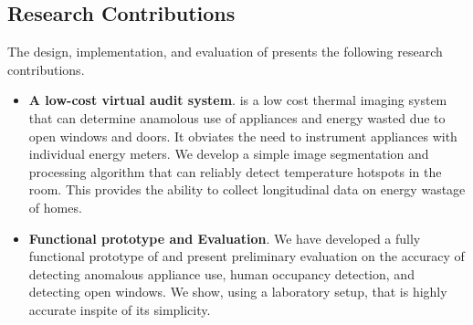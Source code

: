 \subsection*{Research Contributions}

The design, implementation, and evaluation of {\IRLeak} presents 
the following research contributions.

\begin{itemize}
	
 \item {\bf A low-cost virtual audit system}. {\IRLeak} is a low cost thermal imaging system that can determine anamolous use of appliances and energy wasted due to open windows and doors. It obviates the need to 
 instrument appliances with individual energy meters. We develop a simple
 image segmentation and processing algorithm that can reliably detect
 temperature hotspots in the room. This provides the ability to collect
 longitudinal data on energy wastage of homes.
 
 \item {\bf Functional prototype and Evaluation}. We have developed a
 fully functional prototype of {\IRLeak} and present preliminary evaluation
 on the accuracy of detecting anomalous appliance use, human occupancy detection, and detecting open windows. We show, using a laboratory setup,
 that {\IRLeak} is highly accurate inspite of its simplicity.



 \end{itemize}



